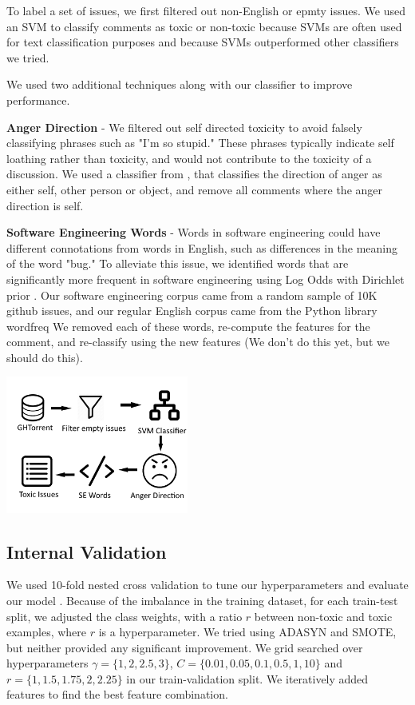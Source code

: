 \documentclass[conference]{IEEEtran}
\begin{document}
To label a set of issues, we first filtered out non-English or epmty issues. We used an SVM to classify comments as toxic or non-toxic because SVMs are often used for text classification purposes \cite{b11} and because SVMs outperformed other classifiers we tried.

We used two additional techniques along with our classifier to improve performance. 

\textbf{Anger Direction} - We filtered out self directed toxicity to avoid falsely classifying phrases such as "I'm so stupid." These phrases typically indicate self loathing rather than toxicity, and would not contribute to the toxicity of a discussion. We used a classifier from \cite{b3}, that classifies the direction of anger as either self, other person or object, and remove all comments where the anger direction is self.  

\textbf{Software Engineering Words} - Words in software engineering could have different connotations from words in English, such as differences in the meaning of the word "bug." To alleviate this issue, we identified words that are significantly more frequent in software engineering using Log Odds with Dirichlet prior \cite{b12}. Our software engineering corpus came from a random sample of 10K github issues, and our regular English corpus came from the Python library wordfreq \cite{b13} We removed each of these words, re-compute the features for the comment, and re-classify using the new features (We don't do this yet, but we should do this).  


\includegraphics[width=6cm]{pipeline.png}


\subsection{Internal Validation} 
We used 10-fold nested cross validation to tune our hyperparameters and evaluate our model \cite{b14}. Because of the imbalance in the training dataset, for each train-test split, we adjusted the class weights, with a ratio $r$ between non-toxic and toxic examples, where $r$ is a hyperparameter. We tried using ADASYN and SMOTE, but neither provided any significant improvement. We grid searched over hyperparameters $\gamma=\{1,2,2.5,3\}$, $C=\{0.01,0.05,0.1,0.5,1,10\}$ and $r=\{1,1.5,1.75,2,2.25\}$ in our train-validation split. We iteratively added features to find the best feature combination.
\end{document}
